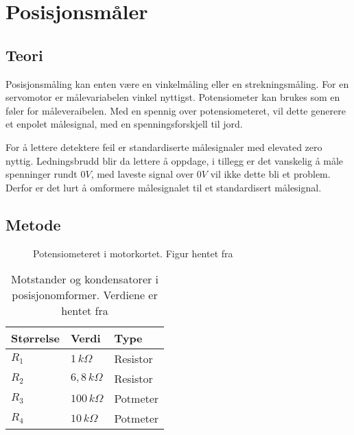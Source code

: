 \section{Posisjonsmåler}
\label{sec:pos_måler}

\subsection{Teori}



Posisjonsmåling kan enten være en vinkelmåling eller en strekningsmåling. For en servomotor er målevariabelen vinkel nyttigst. Potensiometer kan brukes som en føler for måleveraibelen. Med en spennig over potensiometeret, vil dette generere et enpolet målesignal, med en spenningsforskjell til jord.

For å lettere detektere feil er standardiserte målesignaler med elevated zero nyttig. Ledningsbrudd blir da lettere å oppdage, i tillegg er det vanskelig å måle spenninger rundt $0V$, med laveste signal over $0V$ vil ikke dette bli et problem. Derfor er det lurt å omformere målesignalet til et standardisert målesignal.

\subsection{Metode}

\begin{figure}[h]
    \centering
    
    \caption{Potensiometeret i motorkortet. Figur hentet fra \cite{AnalogMotorlabbOppgaver}}
    \label{fig:posisjon_maler_potmeter}
\end{figure}

\begin{table}[h]
    \centering
    \caption{Motstander og kondensatorer i posisjonomformer. Verdiene er hentet fra \cite{AnalogMotorlabbOppgaver}}
    \begin{tabular}{lll}
        \toprule
        Størrelse & Verdi & Type \\
		\midrule
        $R_1$ & $1\,k\Omega$ & Resistor\\
        $R_2$ & $6,8\,k\Omega$ & Resistor \\
        $R_3$ & $100\,k\Omega$ & Potmeter \\
        $R_4$ & $10\,k\Omega$ & Potmeter \\
        \bottomrule
    \end{tabular}
    \label{tab:Komponenter_i_posisjonsmaler}
\end{table}

